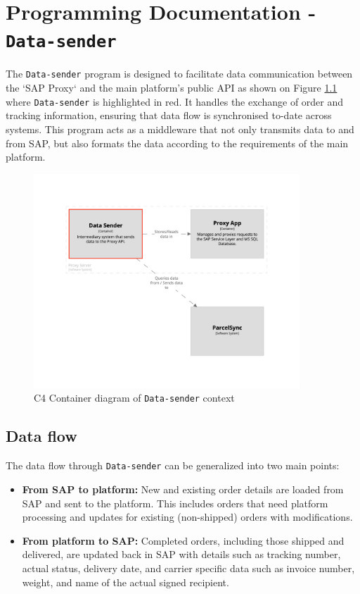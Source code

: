 \chapter{Programming Documentation - \texttt{Data-sender}}
\label{attachments:programming-data-sender}

The \texttt{Data-sender} program is designed to facilitate data communication between the `SAP Proxy` and the main platform's public API as shown on Figure \ref{imgdocs:structurizr:data_sender} where \texttt{Data-sender} is highlighted in red.
It handles the exchange of order and tracking information, ensuring that data flow is synchronised to-date across systems.
This program acts as a middleware that not only transmits data to and from SAP, but also formats the data according to the requirements of the main platform.

\begin{figure}[p]\centering
\includegraphics[width=100mm]{img/docs/fig_data_sender.png}
\caption{C4 Container diagram of \texttt{Data-sender} context}
\label{imgdocs:structurizr:data_sender}
\end{figure}

\section{Data flow}

The data flow through \texttt{Data-sender} can be generalized into two main points:
\begin{itemize}
    \item \textbf{From SAP to platform:} New and existing order details are loaded from SAP and sent to the platform. This includes orders that need platform processing and updates for existing (non-shipped) orders with modifications.
    \item \textbf{From platform to SAP:} Completed orders, including those shipped and delivered, are updated back in SAP with details such as tracking number, actual status, delivery date, and carrier specific data such as invoice number, weight, and name of the actual signed recipient.
\end{itemize}

